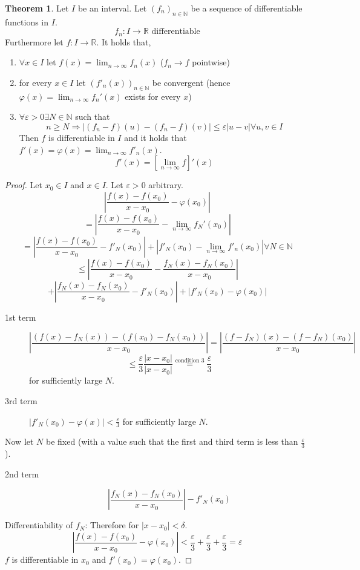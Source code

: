 \documentclass[a4paper,landscape,twocolumn]{article}
\theoremstyle{definition}
\newtheorem{theorem}{Theorem}
\newcommand\abs[1]{\left|#1\right|}
\begin{document}
\begin{theorem}
  Let $I$ be an interval.
  Let $(f_n)_{n\in\mathbb N}$ be a sequence of differentiable functions in $I$.
  \[ f_n: I \to \mathbb R \text{ differentiable} \]
  Furthermore let $f: I \to \mathbb R$.
  It holds that,
  \begin{enumerate}
    \item
      $\forall x \in I$ let $f(x) = \lim_{n\to\infty} f_n(x)$
      ($f_n \to f$ pointwise)
    \item
      for every $x \in I$ let $(f'_n(x))_{n\in\mathbb N}$ be convergent
      (hence $\varphi(x) = \lim_{n\to\infty} f_n'(x)$ exists for every $x$)
    \item
      $\forall \varepsilon > 0 \exists N \in \mathbb N$ such that
      \[ n \geq N \Rightarrow \abs{(f_n - f)(u) - (f_n - f)(v)} \leq \varepsilon \abs{u - v} \forall u,v \in I \]
      Then $f$ is differentiable in $I$ and it holds that $f'(x) = \varphi(x) = \lim_{n\to\infty} f'_n(x)$.
      \[ f'(x) = [\lim_{n\to\infty} f]'(x) \]
  \end{enumerate}
\end{theorem}
\begin{proof}
  Let $x_0 \in I$ and $x \in I$. Let $\varepsilon > 0$ arbitrary.
  \[ \abs{\frac{f(x) - f(x_0)}{x - x_0} - \varphi(x_0)} \]
  \[ = \abs{\frac{f(x) - f(x_0)}{x - x_0} - \lim_{n\to\infty} f_N'(x_0)} \]
  \[ = \abs{\frac{f(x) - f(x_0)}{x - x_0} - f'_N(x_0)} + \abs{f'_N(x_0) - \lim_{n\to\infty} f'_n(x_0)} \forall N \in \mathbb N \]
  \[
    \leq \abs{\frac{f(x) - f(x_0)}{x - x_0} - \frac{f_N(x) - f_N(x_0)}{x - x_0}}
  \] \[
    + \abs{\frac{f_N(x) - f_N(x_0)}{x - x_0} - f'_N(x_0)}
    + \abs{f'_N(x_0) - \varphi(x_0)}
  \]

  \begin{description}
    \item[1st term]
      \[
        \abs{\frac{(f(x) - f_N(x)) - (f(x_0) - f_N(x_0))}{x - x_0}}
        = \abs{\frac{(f - f_N)(x) - (f - f_N)(x_0)}{x - x_0}}
      \] \[
        \leq \frac\varepsilon3 \frac{\abs{x - x_0}}{\abs{x - x_0}}
        \stackrel{\text{condition 3}}{=} \frac{\varepsilon}{3}
      \]
      for sufficiently large $N$.
    \item[3rd term]
      $\abs{f'_N(x_0) - \varphi(x)} < \frac{\varepsilon}{3}$ for sufficiently large $N$.
  \end{description}

  Now let $N$ be fixed (with a value such that the first and third term is less than $\frac\varepsilon3$).

  \begin{description}
    \item[2nd term]
      \[ \abs{\frac{f_N(x) - f_N(x_0)}{x - x_0}} - f'_N(x_0) \]
  \end{description}

  Differentiability of $f_N$:
  Therefore for $\abs{x - x_0} < \delta$.
  \[
    \abs{\frac{f(x) - f(x_0)}{x - x_0} - \varphi(x_0)}
    < \frac\varepsilon3 + \frac\varepsilon3 + \frac\varepsilon3
    = \varepsilon
  \]
  $f$ is differentiable in $x_0$ and $f'(x_0) = \varphi(x_0)$.
\end{proof}
\end{document}
